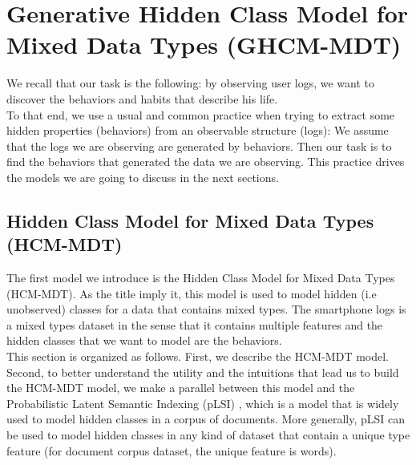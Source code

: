 
\chapter{Generative Hidden Class Model for Mixed Data Types (GHCM-MDT)} %

\label{Chapter3} %


We recall that our task is the following: by observing user logs, we want to discover the behaviors and habits that describe his life. 
\\To that end, we use a usual and common practice when trying to extract some hidden properties (behaviors) from an observable structure (logs): We assume that the logs we are observing are generated by behaviors. Then our task is to find the behaviors that generated the data we are observing. This practice drives the models we are going to discuss in the next sections.


\section{Hidden Class Model for Mixed Data Types (HCM-MDT)}
The first model we introduce is the Hidden Class Model for Mixed Data Types (HCM-MDT). As the title imply it, this model is used to model hidden (i.e unobserved) classes for a data that contains mixed types. The smartphone logs is a mixed types dataset in the sense that it contains multiple features and the hidden classes that we want to model are the behaviors.
\\This section is organized as follows. First, we describe the HCM-MDT model. Second, to better understand the utility and the intuitions that lead us to build the HCM-MDT model, we make a parallel between this model and the Probabilistic Latent Semantic Indexing (pLSI) \cite{plsi}, which is a model that is widely used to model hidden classes in a corpus of documents. More generally, pLSI can be used to model hidden classes in any kind of dataset that contain a unique type feature (for document corpus dataset, the unique feature is words).

